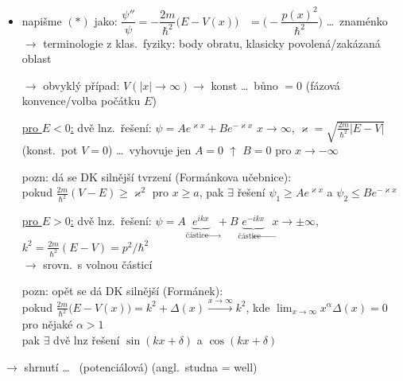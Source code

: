\begin{itemize}
  \item {}

  napišme $(*)$ jako: \quad $\dfrac{\psi''}{\psi} = -\dfrac{2m}{\hbar^2}\big(E - V(x)\big)$
  \ $= \Big(-\dfrac{p(x)^2}{\hbar^2}\Big)$ \quad \dots\ znaménko \\
  $\to$ terminologie z klas.\ fyziky: body obratu, klasicky povolená/zakázaná oblast

  $\to$ obvyklý případ: $V(|x|\to\infty)\to$ konst \dots\ bůno $= 0$ \quad (fázová konvence/volba počátku $E$)

  \underline{pro $E < 0$:} dvě lnz.\ řešení: \quad $\psi = Ae^{\varkappa x} + Be^{-\varkappa x}$ \quad $x\to\infty$, \quad
  $\varkappa = \sqrt{\frac{2m}{\hbar^2}|E - V|}$ \\
  \quad (konst.\ pot $V = 0$) \quad \dots\ vyhovuje jen $A = 0$ $\uparrow$ \qquad $B = 0$ pro $x\to-\infty$

  pozn: dá se DK silnější tvrzení (Formánkova učebnice): \\
  \quad pokud $\frac{2m}{\hbar^2}(V - E) \geq \varkappa^2$ pro $x\geq a$, pak $\exists$ řešení
  $\psi_1 \geq Ae^{\varkappa x}$ a $\psi_2 \leq Be^{-\varkappa x}$ \\
  \quad {}

  \underline{pro $E > 0$:} dvě lnz.\ řešení: \quad
  $\psi = A\underbrace{e^{ikx}}_{\text{částice}\to} + B\underbrace{e^{-ikx}}_{\text{částice}\leftarrow}$ \quad $x\to\pm\infty$, \quad
  $k^2 = \frac{2m}{\hbar^2}(E - V) = p^2/\hbar^2$ \\
  \quad $\to$ srovn.\ s volnou částicí

  pozn: opět se dá DK silnější (Formánek): \\
  \quad pokud $\frac{2m}{\hbar^2}\big(E - V(x)\big) = k^2 + \Delta(x) \xrightarrow{x\to\infty} k^2$, \quad
  kde $\lim_{x\to\infty}x^\alpha\Delta(x) = 0$ pro nějaké $\alpha > 1$ \\
  \quad pak $\exists$ dvě lnz řešení $\sin(kx + \delta)$ a $\cos(kx + \delta)$ \\
  \quad {}
\end{itemize}

\begin{minipage}{0.68\textwidth}
$\to$ shrnutí \dots\  (potenciálová) (angl.\ studna = well) \\
\end{minipage}
\begin{minipage}{0.3\textwidth}
\end{minipage}

